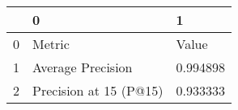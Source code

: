 \begin{tabular}{lll}
\toprule
{} &                       0 &         1 \\
\midrule
0 &                  Metric &     Value \\
1 &       Average Precision &  0.994898 \\
2 &  Precision at 15 (P@15) &  0.933333 \\
\bottomrule
\end{tabular}
